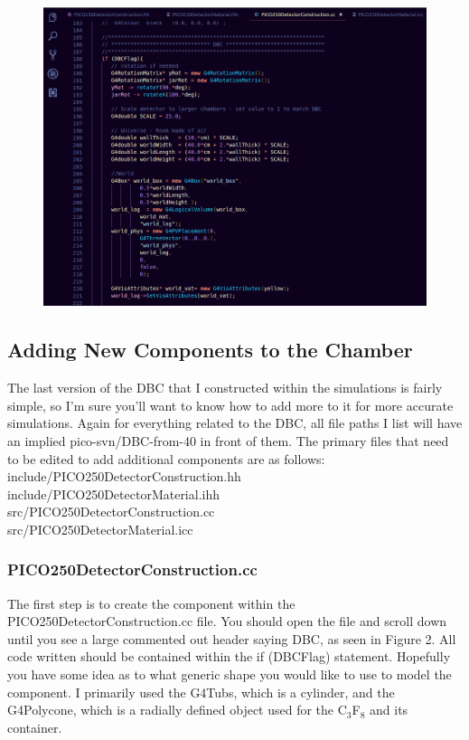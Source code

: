 \documentclass[%
12pt,
twoside,
reprint,
amsmath,amssymb,
aps,
]{article}
\begin{document}
	\begin{figure}[!t]
		\centering
		\includegraphics[scale = 0.55]{Images/detector_construction_cc_test.png}
		\caption{\label{tab:table-name}}
	\end{figure}
	
	\subsection{Adding New Components to the Chamber}
	\par The last version of the DBC that I constructed within the simulations is fairly simple, so I'm sure you'll want to know how to add more to it for more accurate simulations. Again for everything related to the DBC, all file paths I list will have an implied pico-svn/DBC-from-40 in front of them. The primary files that need to be edited to add additional components are as follows: \\
	
	\noindent include/PICO250DetectorConstruction.hh \\
	include/PICO250DetectorMaterial.ihh \\
	src/PICO250DetectorConstruction.cc \\
	src/PICO250DetectorMaterial.icc
	
	\subsubsection{PICO250DetectorConstruction.cc}
	
	\par The first step is to create the component within the PICO250DetectorConstruction.cc file. You should open the file and scroll down until you see a large commented out header saying DBC, as seen in Figure 2. All code written should be contained within the if (DBCFlag) statement. Hopefully you have some idea as to what generic shape you would like to use to model the component. I primarily used the G4Tubs, which is a cylinder, and the G4Polycone, which is a radially defined object used for the C$_{3}$F$_{8}$ and its container.
\end{document}
